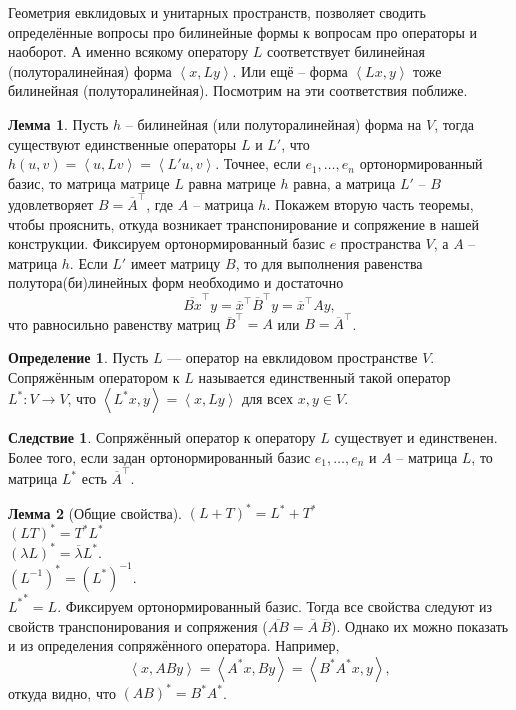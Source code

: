 \documentclass[10pt,a4paper,oneside]{book}
\theoremstyle{definition}
\newtheorem*{defn}{Определение}
\newtheorem{lem}{Лемма}
\newtheorem{cor}{Следствие}
\newcommand{\ovl}{\overline}
\def\lan{\left\langle }
\def\ran{\right\rangle}
\def\dfn{\begin{defn}}
\def\edfn{\end{defn}}
\def\lm{\begin{lem}}
\def\elm{\end{lem}}
\def\crl{\begin{cor}}
\def\ecrl{\end{cor}}
\begin{document}
Геометрия евклидовых и унитарных пространств, позволяет сводить определённые вопросы про билинейные формы к вопросам про операторы и наоборот. А именно всякому оператору $L$ соответствует билинейная (полуторалинейная) форма $\lan x,Ly\ran$. Или ещё -- форма $\lan Lx,y\ran$ тоже билинейная (полуторалинейная). Посмотрим на эти соответствия поближе.

\lm Пусть $h$ -- билинейная (или полуторалинейная) форма на $V$, тогда существуют единственные операторы $L$ и $L'$, что $h(u,v) = \lan u,Lv \ran= \lan L'u,v\ran $. Точнее, если $e_1,\dots,e_n$ ортонормированный базис, то матрица  матрице $L$ равна матрице $h$ равна, а матрица $L'$ -- $B$ удовлетворяет $B=\ovl{A}^{\top}$, где $A$ -- матрица $h$. 
\proof Покажем вторую часть теоремы, чтобы прояснить, откуда возникает транспонирование и сопряжение в нашей конструкции. Фиксируем ортонормированный базис $e$ пространства $V$, а $A$ -- матрица $h$. Если $L'$ имеет матрицу $B$, то для выполнения равенства полутора(би)линейных форм необходимо и достаточно  $$\ovl{Bx}^{\top}y=\ovl{x}^{\top}\ovl{B}^{\top}y=\ovl{x}^{\top}Ay,$$ 
что равносильно равенству матриц $\ovl{B}^{\top}=A$ или $B=\ovl{A}^{\top}$.
\endproof
\elm

\dfn Пусть $L$ --- оператор на евклидовом пространстве $V$. Сопряжённым оператором к $L$ называется единственный такой оператор $L^*\colon V \to V$, что $\lan L^*x,y\ran=\lan x,Ly \ran$ для всех $x,y \in V$.
\edfn

\crl Сопряжённый оператор к оператору $L$ существует и единственен. Более того, если задан ортонормированный базис $e_1,\dots,e_n$ и $A$ -- матрица $L$, то матрица $L^*$ есть $\ovl{A}^{\top}$.
\ecrl









\lm[Общие свойства]
$(L+T)^*=L^*+T^*$\\
$(LT)^*=T^*L^*$\\
$(\lambda L)^*=\ovl{\lambda}L^*$.\\
$(L^{-1})^*=(L^*)^{-1}$.\\
${L^*}^*=L$.
\proof Фиксируем ортонормированный базис. Тогда все свойства следуют из свойств транспонирования и сопряжения ($\ovl{AB} = \ovl{ A} \,\ovl{B}$).
Однако их можно показать и из определения сопряжённого оператора. Например,
$$\lan x, ABy\ran = \lan A^*x, By\ran = \lan B^*A^*x,y\ran,$$
откуда видно, что $(AB)^*=B^* A^*$. 
\endproof
\elm
\end{document}
